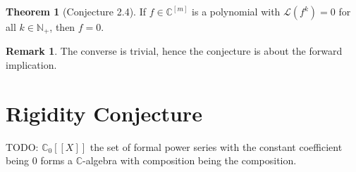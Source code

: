 \documentclass[a4paper]{article}
\theoremstyle{definition}
\newtheorem{theorem}[definition]{Theorem}
\newtheorem*{remark}{Remark}
\begin{document}
%
\begin{theorem}[Conjecture 2.4]
    If \(f \in \mathbb{C}^{[m]}\) is a polynomial with \(\mathcal{L}(f^k) = 0\) for all \(k \in \mathbb{N}_+\), then \(f = 0\).
\end{theorem}
%
\begin{remark}
    The converse is trivial, hence the conjecture is about the forward implication.
\end{remark}
%
\newpage
\section{Rigidity Conjecture}

TODO: \(\mathbb{C}_0[[X]]\) the set of formal power series with the constant coefficient being \(0\) forms a \(\mathbb{C}\)-algebra with composition being the composition.
%
\end{document}
